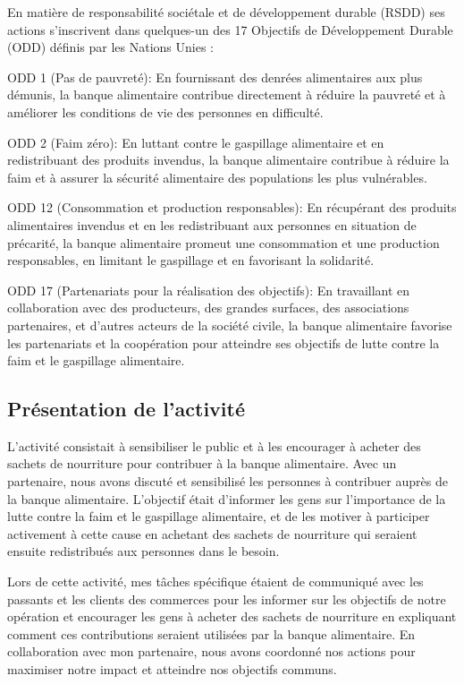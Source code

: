 \documentclass[11pt, openright]{book}
\begin{document}
       En matière de responsabilité sociétale et de développement durable (RSDD) ses actions s'inscrivent dans quelques-un des 17 Objectifs de Développement Durable (ODD) définis par les Nations Unies :
        \begin{items}{-15pt}{-15pt}
           \item ODD 1 (Pas de pauvreté): En fournissant des denrées alimentaires aux plus démunis, la banque alimentaire contribue directement à réduire la pauvreté et à améliorer les conditions de vie des personnes en difficulté.
           \item ODD 2 (Faim zéro): En luttant contre le gaspillage alimentaire et en redistribuant des produits invendus, la banque alimentaire contribue à réduire la faim et à assurer la sécurité alimentaire des populations les plus vulnérables.
           \item ODD 12 (Consommation et production responsables): En récupérant des produits alimentaires invendus et en les redistribuant aux personnes en situation de précarité, la banque alimentaire promeut une consommation et une production responsables, en limitant le gaspillage et en favorisant la solidarité.
           \item ODD 17 (Partenariats pour la réalisation des objectifs): En travaillant en collaboration avec des producteurs, des grandes surfaces, des associations partenaires, et d'autres acteurs de la société civile, la banque alimentaire favorise les partenariats et la coopération pour atteindre ses objectifs de lutte contre la faim et le gaspillage alimentaire.
       \end{items}


     \subsection*{Présentation de l'activité}

     L'activité consistait à sensibiliser le public et à les encourager à acheter des sachets de nourriture pour contribuer à la banque alimentaire. Avec un partenaire, nous avons  discuté et sensibilisé les personnes à contribuer auprès de la banque alimentaire. L'objectif était d'informer les gens sur l'importance de la lutte contre la faim et le gaspillage alimentaire, et de les motiver à participer activement à cette cause en achetant des sachets de nourriture qui seraient ensuite redistribués aux personnes dans le besoin.

     Lors de cette activité, mes tâches spécifique étaient de communiqué avec les passants et les clients des commerces pour les informer sur les objectifs de notre opération et encourager les gens à acheter des sachets de nourriture en expliquant comment ces contributions seraient utilisées par la banque alimentaire. En collaboration avec mon partenaire, nous avons coordonné nos actions pour maximiser notre impact et atteindre nos objectifs communs.
\end{document}

